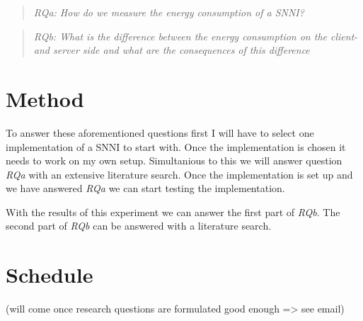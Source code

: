 \documentclass{uva-inf-article}
\begin{document}
\begin{quote} \emph{RQa: How do we measure the energy consumption of a SNNI?} \end{quote}
\begin{quote} \emph{RQb: What is the difference between the energy consumption on the client- and  server side and what are the consequences of this difference} \end{quote}

\section{Method}
To answer these aforementioned questions first I will have to select one implementation of a SNNI to start with. Once the implementation is chosen it needs to work on my own setup. Simultanious to this we will answer question \textit{RQa} with an extensive literature search. Once the implementation is set up and we have answered \textit{RQa} we can start testing the implementation.

With the results of this experiment we can answer the first part of \textit{RQb}. The second part of \textit{RQb} can be answered with a literature search. 


\section{Schedule} 
(will come once research questions are formulated good enough => see email)
% 



\newpage
\printbibliography
\end{document}
